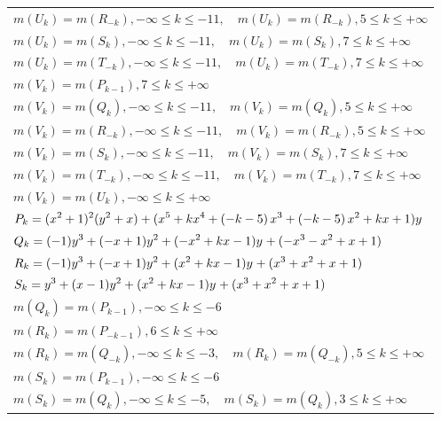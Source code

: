\documentclass{amsart}
\begin{document}
\begin{longtable}{|l|}
\(\displaystyle m(U_k) = m(R_{-k}),-\infty \leqslant k \leqslant -11,\quad m(U_k) = m(R_{-k}),5 \leqslant k \leqslant +\infty\)\\
\(\displaystyle m(U_k) = m(S_{k}),-\infty \leqslant k \leqslant -11,\quad m(U_k) = m(S_{k}),7 \leqslant k \leqslant +\infty\)\\
\(\displaystyle m(U_k) = m(T_{-k}),-\infty \leqslant k \leqslant -11,\quad m(U_k) = m(T_{-k}),7 \leqslant k \leqslant +\infty\)\\
\(\displaystyle m(V_k) = m(P_{k
 - 1}),7 \leqslant k \leqslant +\infty\)\\
\(\displaystyle m(V_k) = m(Q_{k}),-\infty \leqslant k \leqslant -11,\quad m(V_k) = m(Q_{k}),5 \leqslant k \leqslant +\infty\)\\
\(\displaystyle m(V_k) = m(R_{-k}),-\infty \leqslant k \leqslant -11,\quad m(V_k) = m(R_{-k}),5 \leqslant k \leqslant +\infty\)\\
\(\displaystyle m(V_k) = m(S_{k}),-\infty \leqslant k \leqslant -11,\quad m(V_k) = m(S_{k}),7 \leqslant k \leqslant +\infty\)\\
\(\displaystyle m(V_k) = m(T_{-k}),-\infty \leqslant k \leqslant -11,\quad m(V_k) = m(T_{-k}),7 \leqslant k \leqslant +\infty\)\\
\(\displaystyle m(V_k) = m(U_{k}),-\infty \leqslant k \leqslant +\infty\)\\
\hline
\(\displaystyle P_k=(x^2
 + 1)^{2}(y^2+x)+(x^5
 + k\*x^4
 + \left(-k
 - 5\right) \*x^3
 + \left(-k
 - 5\right) \*x^2
 + k\*x
 + 1)y\)\\
\(\displaystyle Q_k=(-1)y^{3}+(-x
 + 1)y^{2}+(-x^2
 + k\*x
 - 1)y^{}+(-x^3
 - x^2
 + x
 + 1)\)\\
\(\displaystyle R_k=(-1)y^{3}+(-x
 + 1)y^{2}+(x^2
 + k\*x
 - 1)y^{}+(x^3
 + x^2
 + x
 + 1)\)\\
\(\displaystyle S_k=y^{3}+(x
 - 1)y^{2}+(x^2
 + k\*x
 - 1)y^{}+(x^3
 + x^2
 + x
 + 1)\)\\
\(\displaystyle m(Q_k) = m(P_{k
 - 1}),-\infty \leqslant k \leqslant -6\)\\
\(\displaystyle m(R_k) = m(P_{-k
 - 1}),6 \leqslant k \leqslant +\infty\)\\
\(\displaystyle m(R_k) = m(Q_{-k}),-\infty \leqslant k \leqslant -3,\quad m(R_k) = m(Q_{-k}),5 \leqslant k \leqslant +\infty\)\\
\(\displaystyle m(S_k) = m(P_{k
 - 1}),-\infty \leqslant k \leqslant -6\)\\
\(\displaystyle m(S_k) = m(Q_{k}),-\infty \leqslant k \leqslant -5,\quad m(S_k) = m(Q_{k}),3 \leqslant k \leqslant +\infty\)\\

\end{longtable}
\end{document}
